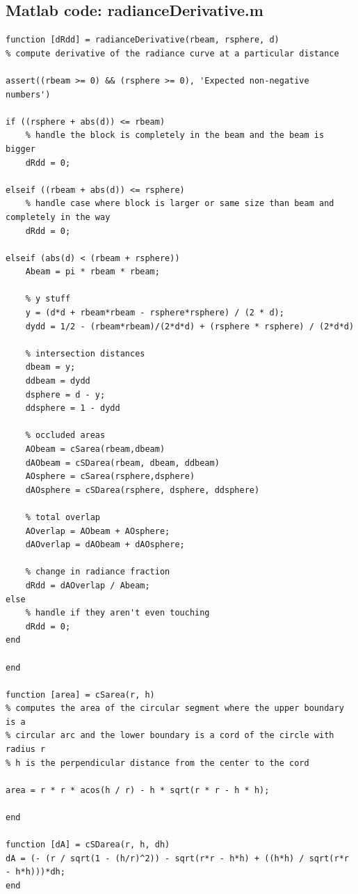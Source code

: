 \documentclass{article}
\theoremstyle{plain}
\theoremstyle{definition}
\theoremstyle{remark}
\begin{document}
\subsection*{Matlab code: radianceDerivative.m}
\begin{verbatim}
function [dRdd] = radianceDerivative(rbeam, rsphere, d)
% compute derivative of the radiance curve at a particular distance

assert((rbeam >= 0) && (rsphere >= 0), 'Expected non-negative numbers')

if ((rsphere + abs(d)) <= rbeam)
    % handle the block is completely in the beam and the beam is bigger
    dRdd = 0;
    
elseif ((rbeam + abs(d)) <= rsphere)
    % handle case where block is larger or same size than beam and completely in the way
    dRdd = 0;
    
elseif (abs(d) < (rbeam + rsphere))
    Abeam = pi * rbeam * rbeam;
    
    % y stuff
    y = (d*d + rbeam*rbeam - rsphere*rsphere) / (2 * d);
    dydd = 1/2 - (rbeam*rbeam)/(2*d*d) + (rsphere * rsphere) / (2*d*d)
    
    % intersection distances
    dbeam = y;
    ddbeam = dydd
    dsphere = d - y;
    ddsphere = 1 - dydd
    
    % occluded areas
    AObeam = cSarea(rbeam,dbeam)
    dAObeam = cSDarea(rbeam, dbeam, ddbeam)
    AOsphere = cSarea(rsphere,dsphere)
    dAOsphere = cSDarea(rsphere, dsphere, ddsphere)
    
    % total overlap
    AOverlap = AObeam + AOsphere;
    dAOverlap = dAObeam + dAOsphere;
    
    % change in radiance fraction
    dRdd = dAOverlap / Abeam;
else
    % handle if they aren't even touching
    dRdd = 0;
end

end

function [area] = cSarea(r, h) 
% computes the area of the circular segment where the upper boundary is a
% circular arc and the lower boundary is a cord of the circle with radius r
% h is the perpendicular distance from the center to the cord

area = r * r * acos(h / r) - h * sqrt(r * r - h * h);

end

function [dA] = cSDarea(r, h, dh)
dA = (- (r / sqrt(1 - (h/r)^2)) - sqrt(r*r - h*h) + ((h*h) / sqrt(r*r - h*h)))*dh;
end
\end{verbatim}
\end{document}
